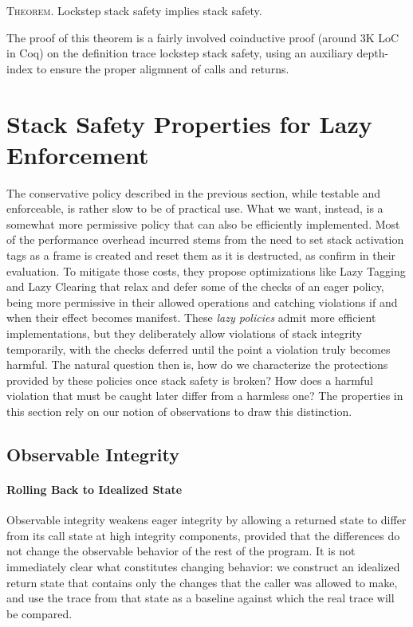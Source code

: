 \documentclass[acmsmall,review,anonymous]{acmart}\settopmatter{printfolios=true,printccs=false,printacmref=false}
\begin{document}
{\medskip
\textsc{Theorem.}
Lockstep stack safety implies stack safety.
\smallskip

The proof of this theorem is a fairly involved coinductive proof
(around 3K LoC in Coq) on the definition trace lockstep stack safety,
using an auxiliary depth-index to ensure the proper aligmnent of
calls and returns.

\section{Stack Safety Properties for Lazy Enforcement}
\label{sec:lazy}

The conservative policy described in the previous section, while
testable and enforceable, is rather slow to be of practical use. What
we want, instead, is a somewhat more permissive policy that can also
be efficiently implemented. Most of the performance overhead incurred
stems from the need to set stack activation tags as a frame is created
and reset them as it is destructed, as
\citet{DBLP:conf/sp/RoesslerD18} confirm in their evaluation. To
mitigate those costs, they propose optimizations like Lazy Tagging and
Lazy Clearing that relax and defer some of the checks of an eager
policy, being more permissive in their allowed operations and catching
violations if and when their effect becomes manifest.
%
These \emph{lazy policies} admit more efficient implementations, but
they deliberately allow violations of stack integrity temporarily,
with the checks deferred until the point a violation truly becomes
harmful. The natural question then is, how do we characterize the
protections provided by these policies once stack safety is broken?
How does a harmful violation that must be caught later differ from a
harmless one? The properties in this section rely on our notion of
observations to draw this distinction.

\subsection{Observable Integrity}

\paragraph{Rolling Back to Idealized State}

Observable integrity weakens eager integrity by allowing a returned
state to differ from its call state at high integrity components,
provided that the differences do not change the observable behavior of
the rest of the program. It is not immediately clear what constitutes
changing behavior: we construct an idealized return state that
contains only the changes that the caller was allowed to make, and use
the trace from that state as a baseline against which the real trace
will be compared.

}
\end{document}
